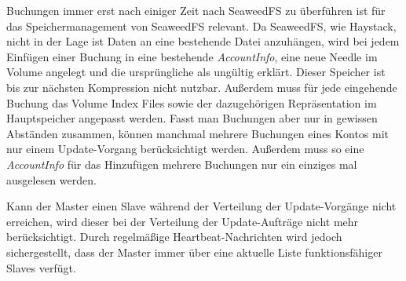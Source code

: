 \documentclass[12pt,oneside,a4paper,parskip]{scrbook}
\begin{document}
Buchungen immer erst nach einiger Zeit nach SeaweedFS zu überführen ist für das Speichermanagement von SeaweedFS relevant. Da SeaweedFS, wie Haystack, nicht in der Lage ist Daten an eine bestehende Datei anzuhängen, wird bei jedem Einfügen einer Buchung in eine bestehende \textit{AccountInfo}, eine neue Needle im Volume angelegt und die ursprüngliche als ungültig erklärt. Dieser Speicher ist bis zur nächsten Kompression nicht nutzbar. Außerdem muss für jede eingehende Buchung das Volume Index Files sowie der dazugehörigen Repräsentation im Hauptspeicher angepasst werden. Fasst man Buchungen aber nur in gewissen Abständen zusammen, können manchmal mehrere Buchungen eines Kontos mit nur einem Update-Vorgang berücksichtigt werden. Außerdem muss so eine \textit{AccountInfo} für das Hinzufügen mehrere Buchungen nur ein einziges mal ausgelesen werden.

Kann der Master einen Slave während der Verteilung der Update-Vorgänge nicht erreichen, wird dieser bei der Verteilung der Update-Aufträge nicht mehr berücksichtigt. Durch regelmäßige Heartbeat-Nachrichten wird jedoch sichergestellt, dass der Master immer über eine aktuelle Liste funktionsfähiger Slaves verfügt. 
\end{document}
